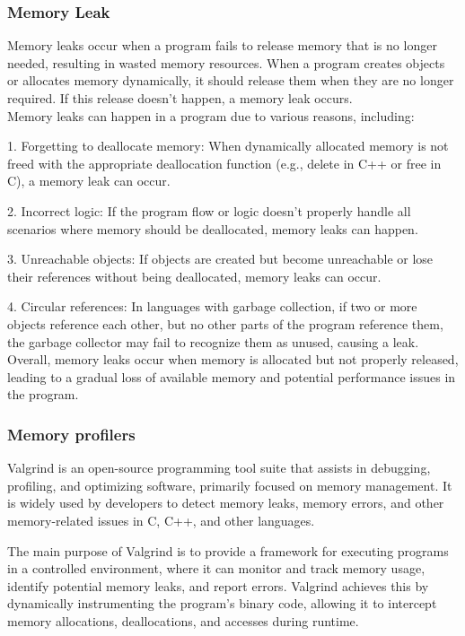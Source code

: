 \documentclass[12pt]{article}
\begin{document}
\subsubsection{Memory Leak}
Memory leaks occur when a program fails to release memory that is no longer needed, resulting in wasted memory resources. When a program creates objects or allocates memory dynamically, it should release them when they are no longer required. If this release doesn't happen, a memory leak occurs.\\
Memory leaks can happen in a program due to various reasons, including:

1. Forgetting to deallocate memory: When dynamically allocated memory is not freed with the appropriate deallocation function (e.g., delete in C++ or free in C), a memory leak can occur.

2. Incorrect logic: If the program flow or logic doesn't properly handle all scenarios where memory should be deallocated, memory leaks can happen.

3. Unreachable objects: If objects are created but become unreachable or lose their references without being deallocated, memory leaks can occur.

4. Circular references: In languages with garbage collection, if two or more objects reference each other, but no other parts of the program reference them, the garbage collector may fail to recognize them as unused, causing a leak.\\
Overall, memory leaks occur when memory is allocated but not properly released, leading to a gradual loss of available memory and potential performance issues in the program.
\subsubsection{Memory profilers}
Valgrind is an open-source programming tool suite that assists in debugging, profiling, and optimizing software, primarily focused on memory management. It is widely used by developers to detect memory leaks, memory errors, and other memory-related issues in C, C++, and other languages.



The main purpose of Valgrind is to provide a framework for executing programs in a controlled environment, where it can monitor and track memory usage, identify potential memory leaks, and report errors. Valgrind achieves this by dynamically instrumenting the program's binary code, allowing it to intercept memory allocations, deallocations, and accesses during runtime.
\end{document}
